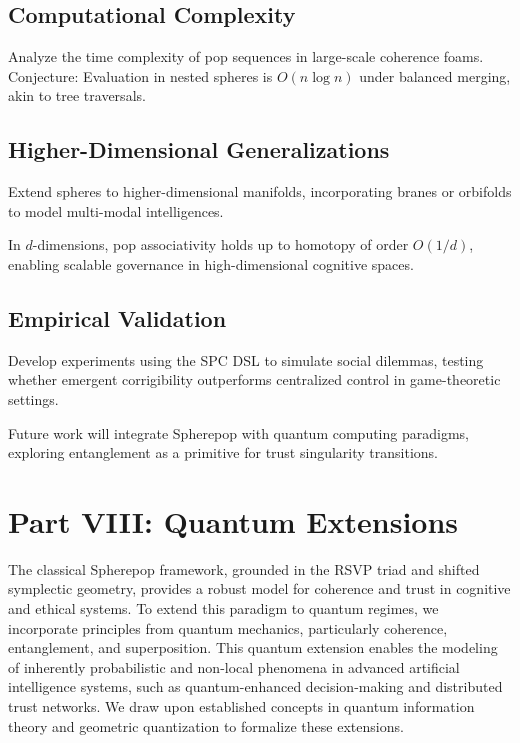 \documentclass[12pt]{article}
\begin{document}
\subsection{Computational Complexity}
Analyze the time complexity of pop sequences in large-scale coherence foams. Conjecture: Evaluation in nested spheres is \(O(n \log n)\) under balanced merging, akin to tree traversals.

\subsection{Higher-Dimensional Generalizations}
Extend spheres to higher-dimensional manifolds, incorporating branes or orbifolds to model multi-modal intelligences.

\begin{conjecture}
In \(d\)-dimensions, pop associativity holds up to homotopy of order \(O(1/d)\), enabling scalable governance in high-dimensional cognitive spaces.
\end{conjecture}

\subsection{Empirical Validation}
Develop experiments using the SPC DSL to simulate social dilemmas, testing whether emergent corrigibility outperforms centralized control in game-theoretic settings.

Future work will integrate Spherepop with quantum computing paradigms, exploring entanglement as a primitive for trust singularity transitions.

\section*{Part VIII: Quantum Extensions}

The classical Spherepop framework, grounded in the RSVP triad and shifted symplectic geometry, provides a robust model for coherence and trust in cognitive and ethical systems. To extend this paradigm to quantum regimes, we incorporate principles from quantum mechanics, particularly coherence, entanglement, and superposition. This quantum extension enables the modeling of inherently probabilistic and non-local phenomena in advanced artificial intelligence systems, such as quantum-enhanced decision-making and distributed trust networks. We draw upon established concepts in quantum information theory and geometric quantization to formalize these extensions.
\end{document}
